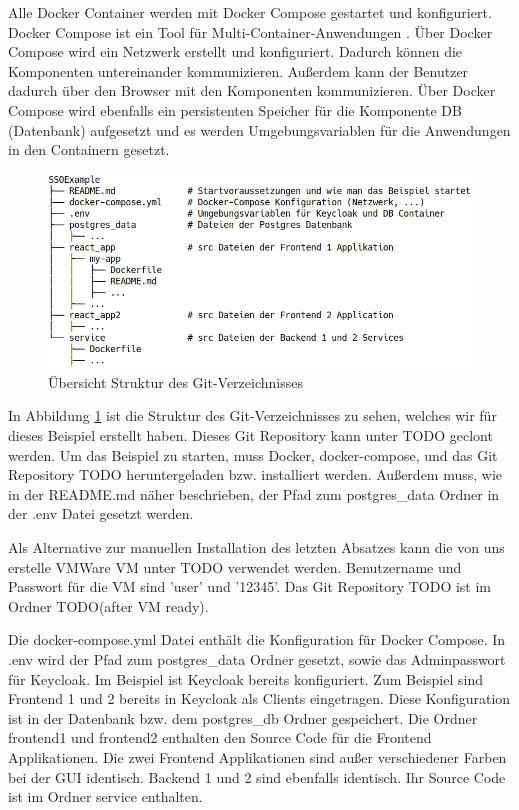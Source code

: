 Alle Docker Container werden mit Docker Compose gestartet und konfiguriert. Docker Compose ist ein Tool für Multi-Container-Anwendungen \cite{EB40}. Über Docker Compose wird ein Netzwerk erstellt und konfiguriert. Dadurch können die Komponenten untereinander kommunizieren. Außerdem kann der Benutzer dadurch über den Browser mit den Komponenten kommunizieren. Über Docker Compose wird ebenfalls ein persistenten Speicher für die Komponente DB (Datenbank) aufgesetzt und es werden Umgebungsvariablen für die Anwendungen in den Containern gesetzt.

\begin{figure}[!ht]
	\centering
	\includegraphics[width=1\textwidth]{Images/Ebert/srcDirectoryStructure.PNG}
	\caption{Übersicht Struktur des Git-Verzeichnisses}
	\label{fig:EB_Struktur des Git-Verzeichnisses}
\end{figure} %

In Abbildung \ref{fig:EB_Struktur des Git-Verzeichnisses} ist die Struktur des Git-Verzeichnisses zu sehen, welches wir für dieses Beispiel erstellt haben. Dieses Git Repository kann unter TODO geclont werden. Um das Beispiel zu starten, muss Docker, docker-compose, und das Git Repository TODO heruntergeladen bzw. installiert werden. Außerdem muss, wie in der README.md näher beschrieben, der Pfad zum postgres\_data Ordner in der .env Datei gesetzt werden.

Als Alternative zur manuellen Installation des letzten Absatzes kann die von uns erstelle VMWare VM unter TODO verwendet werden. Benutzername und Passwort für die VM sind 'user' und '12345'. Das Git Repository TODO ist im Ordner TODO(after VM ready).

Die docker-compose.yml Datei enthält die Konfiguration für Docker Compose. In .env wird der Pfad zum postgres\_data Ordner gesetzt, sowie das Adminpasswort für Keycloak. Im Beispiel ist Keycloak bereits konfiguriert. Zum Beispiel sind Frontend 1 und 2 bereits in Keycloak als Clients eingetragen. Diese Konfiguration ist in der Datenbank bzw. dem postgres\_db Ordner gespeichert. Die Ordner frontend1 und frontend2 enthalten den Source Code für die Frontend Applikationen. Die zwei Frontend Applikationen sind außer verschiedener Farben bei der GUI identisch. Backend 1 und 2 sind ebenfalls identisch. Ihr Source Code ist im Ordner service enthalten. 


